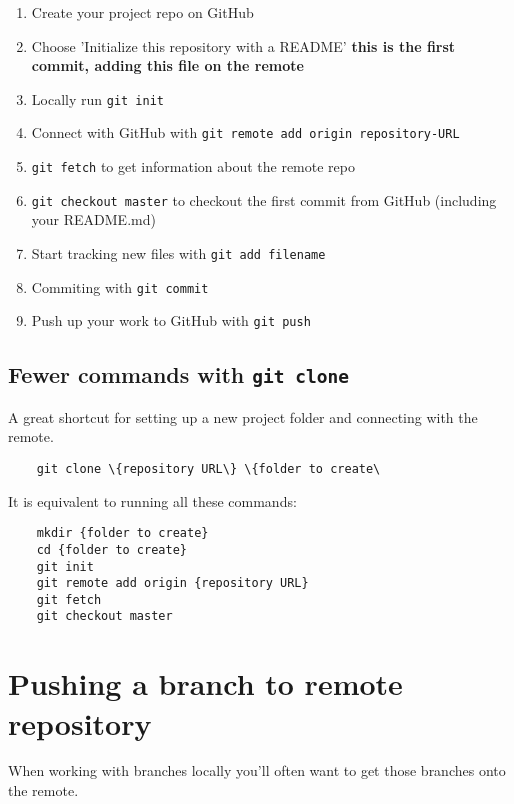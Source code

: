 \begin{enumerate}
    \item Create your project repo on GitHub
    \item Choose 'Initialize this repository with a README' \textbf{this is the first commit, adding this file on the remote}
    \item Locally run \texttt{git init}
    \item Connect with GitHub with \texttt{git remote add origin {repository-URL}}
    \item \texttt{git fetch} to get information about the remote repo
    \item \texttt{git checkout master} to checkout the first commit from GitHub (including your README.md)
    \item Start tracking new files with \texttt{git add {filename}}
    \item Commiting with \texttt{git commit}
    \item Push up your work to GitHub with \texttt{git push}
\end{enumerate}

\subsection{Fewer commands with \texttt{git clone}}

A great shortcut for setting up a new project folder and connecting with the remote.
\\

\begin{verbatim}
    git clone \{repository URL\} \{folder to create\
\end{verbatim}


It is equivalent to running all these commands:

\begin{verbatim}
    mkdir {folder to create}
    cd {folder to create}
    git init
    git remote add origin {repository URL}
    git fetch
    git checkout master
\end{verbatim}

\section{Pushing a branch to remote repository}

When working with branches locally you'll often want to get those branches onto the remote.
\\


